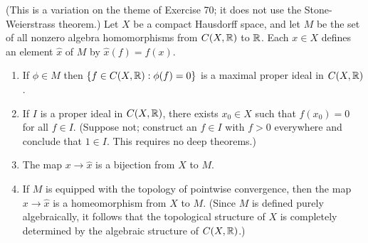 \documentclass[12pt,a4paper]{article}
\begin{document}
\begin{problem}\label{prob:4-71}
(This is a variation on the theme of Exercise 70; it does not use the Stone-Weierstrass theorem.) Let $X$ be a compact Hausdorff space, and let $M$ be the set of all nonzero algebra homomorphisms from $C(X,\mathbb{R})$ to $\mathbb{R}$. Each $x \in X$ defines an element $\hat{x}$ of $M$ by $\hat{x}(f) = f(x)$.
\begin{enumerate}[label=\alph*.]
    \item If $\phi \in M$ then $\{f \in C(X,\mathbb{R}) : \phi(f) = 0\}$ is a maximal proper ideal in $C(X,\mathbb{R})$.
    \item If $I$ is a proper ideal in $C(X,\mathbb{R})$, there exists $x_0 \in X$ such that $f(x_0) = 0$ for all $f \in I$. (Suppose not; construct an $f \in I$ with $f > 0$ everywhere and conclude that $1 \in I$. This requires no deep theorems.)
    \item The map $x \to \hat{x}$ is a bijection from $X$ to $M$.
    \item If $M$ is equipped with the topology of pointwise convergence, then the map $x \to \hat{x}$ is a homeomorphism from $X$ to $M$. (Since $M$ is defined purely algebraically, it follows that the topological structure of $X$ is completely determined by the algebraic structure of $C(X,\mathbb{R})$.)
\end{enumerate}
\end{problem}
\end{document}
